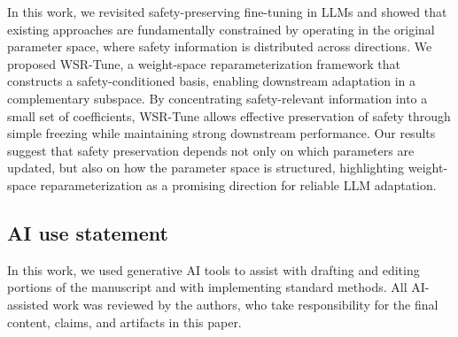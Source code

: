 \documentclass{article}
\begin{document}
In this work, we revisited safety-preserving fine-tuning in LLMs and showed that existing approaches are fundamentally constrained by operating in the original parameter space, where safety information is distributed across directions. We proposed WSR-Tune, a weight-space reparameterization framework that constructs a safety-conditioned basis, enabling downstream adaptation in a complementary subspace. By concentrating safety-relevant information into a small set of coefficients, WSR-Tune allows effective preservation of safety through simple freezing while maintaining strong downstream performance. 
Our results suggest that safety preservation depends not only on which parameters are updated, but also on how the parameter space is structured, highlighting weight-space reparameterization as a promising direction for reliable LLM adaptation. %








\subsection*{AI use statement}
In this work, we used generative AI tools to assist with drafting and editing portions of the manuscript and with implementing standard methods. All AI-assisted work was reviewed by the authors, who take responsibility for the final content, claims, and artifacts in this paper.





\clearpage
\appendix
\end{document}
